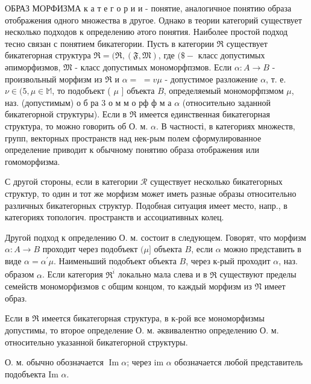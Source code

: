 \documentclass[10pt]{article}
\begin{document}
ОБРАЗ МОРФИЗМА к а т е г о р и и - понятие, аналогичное понятию образа отображения одного множества в другое. Однако в теории категорий существует несколько подходов к определению әтого понятия. Наиболее простой подход тесно связан с понятием бикатегории. Пусть в категории $\mathfrak{\Re}$ существует бикатегорная структура $\mathfrak{\Re}=(\mathfrak{R},(\mathfrak{F}, \mathfrak{M})$, где $(\$-$ класс допустимых әпиморфизмов, $\mathfrak{M}$ - класс допустимых мономорфпзмов. Если $\alpha: A \rightarrow B$ - произвольный морфизм из $\mathscr{\Re}$ и $\alpha=$ $=v \mu$ - допустимое разложение $\alpha$, т. е. $\nu \in(5, \mu \in \mathbb{M}$, то подобъект ( $\mu$ ] объекта $B$, определяемый мономорфпзмом $\mu$, наз. (допустимым) о б ра 3 о м м о рф ф м а $\alpha$ (относительно заданной бикатегорной структуры). Если в $\Re$ имеется единственная бикатегорная структура, то можно говорить об О. м. $\alpha$. В частності, в категориях множеств, групп, векторных пространств над нек-рым полем сформулированное определение приводит к обычному понятию образа отображения или гомоморфизма.



С другой стороны, если в категории $\mathscr{R}$ существует несколько бикатегорных структур, то один и тот же морфизм может иметь разные образы относительно различных бикатегорных структур. Подобная ситуация имеет место, напр., в категориях топологич. пространств и ассоциативных колец.



Другой подход к определению О. м. состоит в следующем. Говорят, что морфизм $\alpha: A \rightarrow B$ проходит через подобъект $(\mu]$ объекта $B$, если $\alpha$ можно представить в виде $\alpha=\alpha^{\prime} \mu$. Наименьший подобъект объекта $B$, через к-рый проходит $\alpha$, наз. образом $\alpha$. Если категория $\Re^{\hat{i}}$ локально мала слева и в $\mathfrak{R}$ существуют пределы семейств мономорфизмов с общим концом, то каждый морфизм из $\mathfrak{N}$ имеет образ.



Если в $\Re$ имеется бикатегорная структура, в к-рой все мономорфизмы допустимы, то второе определение О. м. әквивалентно определению О. м. относительно указанной бикатегорной структуры.



О. м. обычно обозначается $\operatorname{Im} \alpha$; через im $\alpha$ обозначается любой представитель подобъекта Im $\alpha$.
\end{document}
